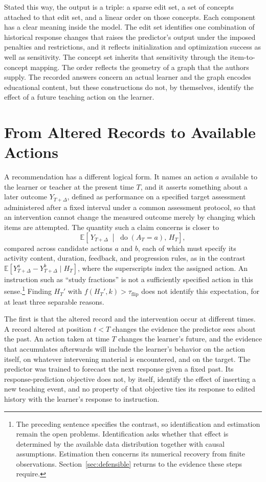 \documentclass[11pt]{article}
\newcommand{\Hist}{H}
\newcommand{\dop}{\operatorname{do}}
\newcommand{\Ex}{\mathbb{E}}
\begin{document}
Stated this way, the output is a triple: a sparse edit set, a set of concepts attached to that edit set, and a linear order on those concepts. Each component has a clear meaning inside the model. The edit set identifies one combination of historical response changes that raises the predictor's output under the imposed penalties and restrictions, and it reflects initialization and optimization success as well as sensitivity. The concept set inherits that sensitivity through the item-to-concept mapping. The order reflects the geometry of a graph that the authors supply. The recorded answers concern an actual learner and the graph encodes educational content, but these constructions do not, by themselves, identify the effect of a future teaching action on the learner.

\section{From Altered Records to Available Actions}

A recommendation has a different logical form. It names an action $a$ available to the learner or teacher at the present time $T$, and it asserts something about a later outcome $Y_{T+\Delta}$, defined as performance on a specified target assessment administered after a fixed interval under a common assessment protocol, so that an intervention cannot change the measured outcome merely by changing which items are attempted. The quantity such a claim concerns is closer to
\[
\Ex\!\left[\,Y_{T+\Delta}\;\middle|\;\dop(A_T=a),\,\Hist_T\right],
\]
compared across candidate actions $a$ and $b$, each of which must specify its activity content, duration, feedback, and progression rules, as in the contrast $\Ex[Y^{a}_{T+\Delta}-Y^{b}_{T+\Delta}\mid\Hist_T]$, where the superscripts index the assigned action. An instruction such as ``study fractions'' is not a sufficiently specified action in this sense.\footnote{The preceding sentence specifies the contrast, so identification and estimation remain the open problems. Identification asks whether that effect is determined by the available data distribution together with causal assumptions. Estimation then concerns its numerical recovery from finite observations. Section~\ref{sec:defensible} returns to the evidence these steps require.} Finding $\Hist_T'$ with $f(\Hist_T',k)>\tau_{\mathrm{flip}}$ does not identify this expectation, for at least three separable reasons.

The first is that the altered record and the intervention occur at different times. A record altered at position $t<T$ changes the evidence the predictor sees about the past. An action taken at time $T$ changes the learner's future, and the evidence that accumulates afterwards will include the learner's behavior on the action itself, on whatever intervening material is encountered, and on the target. The predictor was trained to forecast the next response given a fixed past. Its response-prediction objective does not, by itself, identify the effect of inserting a new teaching event, and no property of that objective ties its response to edited history with the learner's response to instruction.
\end{document}

